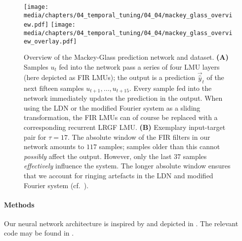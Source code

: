 \begin{figure}
	\texttt{[image: media/chapters/04\_temporal\_tuning/04\_04/mackey\_glass\_overview.pdf]}%
	\kern-158mm\texttt{[image: media/chapters/04\_temporal\_tuning/04\_04/mackey\_glass\_overview\_overlay.pdf]}\\[0.25cm]
	{\label{fig:mackey_glass_overview_overlay_a}}%
	{\label{fig:mackey_glass_overview_overlay_b}}%
	\caption[Overview of the Mackey-Glass prediction network and dataset]{
		Overview of the Mackey-Glass prediction network and dataset.
		\textbf{(A)} Samples $u_t$ fed into the network pass a series of four LMU layers (here depicted as FIR LMUs); the output is a prediction $\vec{\hat y}_t$ of the next fifteen samples $u_{t + 1}, \ldots, u_{t + 15}$.
		Every sample fed into the network immediately updates the prediction in the output.
		When using the LDN or the modified Fourier system as a sliding transformation, the FIR LMUs can of course be replaced with a corresponding recurrent LRGF LMU.
		\textbf{(B)} Exemplary input-target pair for $\tau = 17$.
		The absolute window of the FIR filters in our network amounts to $117$ samples; samples older than this cannot \emph{possibly} affect the output. However, only the last $37$ samples \emph{effectively} influence the system.
		The longer absolute window ensures that we account for ringing artefacts in the LDN and modified Fourier system (cf.~).
	}
\end{figure}

\paragraph{Methods}
Our neural network architecture is inspired by \citet{voelker2019lmu} and depicted in .
The relevant code may be found in .

